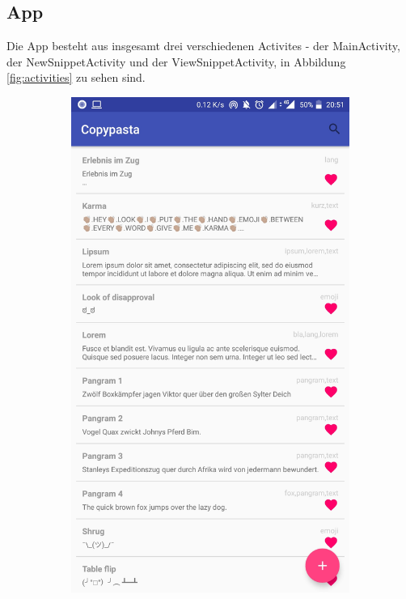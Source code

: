 \documentclass[11pt]{article}
\begin{document}
		
		\subsection{App}
			Die App besteht aus insgesamt drei verschiedenen Activites - der MainActivity, der NewSnippetActivity und der ViewSnippetActivity, in Abbildung \ref{fig:activities} zu sehen sind. 
			
			\begin{figure}
				\centering
				\begin{subfigure}[b]{0.3\textwidth}
					\includegraphics[width=\textwidth]{Konzepte/screenshots/main_list.jpg}

\end{subfigure}
\end{figure}
\end{document}
